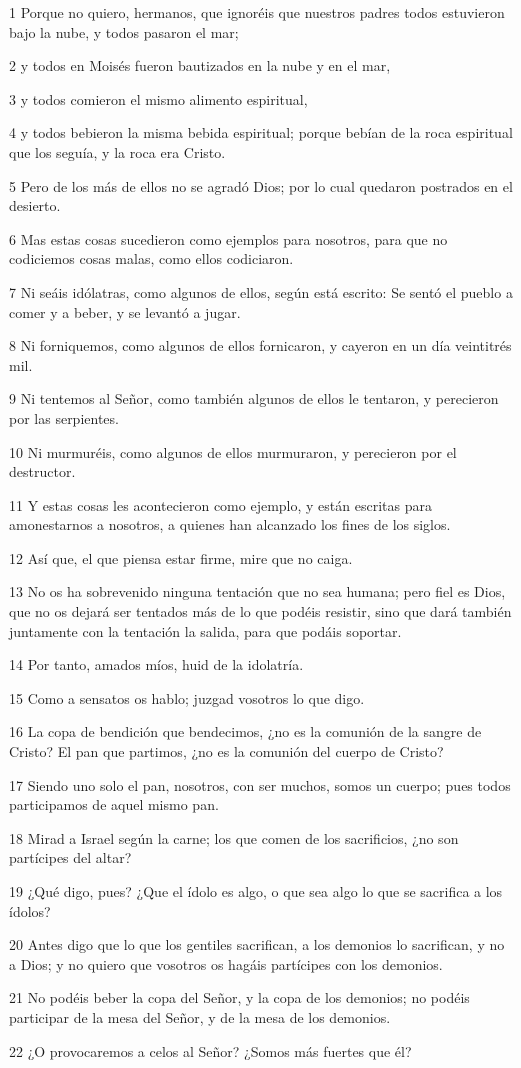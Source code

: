 \par 1 Porque no quiero, hermanos, que ignoréis que nuestros padres todos estuvieron bajo la nube, y todos pasaron el mar;
\par 2 y todos en Moisés fueron bautizados en la nube y en el mar,
\par 3 y todos comieron el mismo alimento espiritual,
\par 4 y todos bebieron la misma bebida espiritual; porque bebían de la roca espiritual que los seguía, y la roca era Cristo.
\par 5 Pero de los más de ellos no se agradó Dios; por lo cual quedaron postrados en el desierto.
\par 6 Mas estas cosas sucedieron como ejemplos para nosotros, para que no codiciemos cosas malas, como ellos codiciaron.
\par 7 Ni seáis idólatras, como algunos de ellos, según está escrito: Se sentó el pueblo a comer y a beber, y se levantó a jugar.
\par 8 Ni forniquemos, como algunos de ellos fornicaron, y cayeron en un día veintitrés mil.
\par 9 Ni tentemos al Señor, como también algunos de ellos le tentaron, y perecieron por las serpientes.
\par 10 Ni murmuréis, como algunos de ellos murmuraron, y perecieron por el destructor.
\par 11 Y estas cosas les acontecieron como ejemplo, y están escritas para amonestarnos a nosotros, a quienes han alcanzado los fines de los siglos.
\par 12 Así que, el que piensa estar firme, mire que no caiga.
\par 13 No os ha sobrevenido ninguna tentación que no sea humana; pero fiel es Dios, que no os dejará ser tentados más de lo que podéis resistir, sino que dará también juntamente con la tentación la salida, para que podáis soportar.
\par 14 Por tanto, amados míos, huid de la idolatría.
\par 15 Como a sensatos os hablo; juzgad vosotros lo que digo.
\par 16 La copa de bendición que bendecimos, ¿no es la comunión de la sangre de Cristo? El pan que partimos, ¿no es la comunión del cuerpo de Cristo?
\par 17 Siendo uno solo el pan, nosotros, con ser muchos, somos un cuerpo; pues todos participamos de aquel mismo pan.
\par 18 Mirad a Israel según la carne; los que comen de los sacrificios, ¿no son partícipes del altar?
\par 19 ¿Qué digo, pues? ¿Que el ídolo es algo, o que sea algo lo que se sacrifica a los ídolos?
\par 20 Antes digo que lo que los gentiles sacrifican, a los demonios lo sacrifican, y no a Dios; y no quiero que vosotros os hagáis partícipes con los demonios.
\par 21 No podéis beber la copa del Señor, y la copa de los demonios; no podéis participar de la mesa del Señor, y de la mesa de los demonios.
\par 22 ¿O provocaremos a celos al Señor? ¿Somos más fuertes que él?

